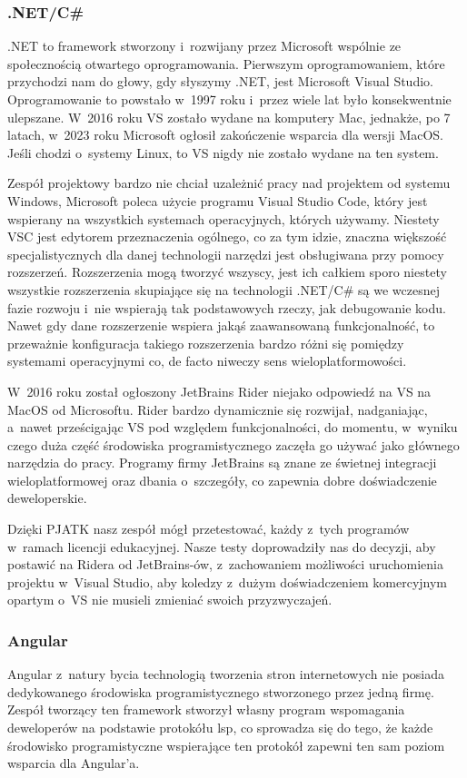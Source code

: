 \subsubsection{.NET/C\#}
.NET to framework stworzony i~rozwijany przez Microsoft wspólnie ze społecznością otwartego oprogramowania.
Pierwszym oprogramowaniem, które przychodzi nam do głowy, gdy słyszymy .NET, jest Microsoft Visual Studio.
Oprogramowanie to powstało w~1997 roku i~przez wiele lat było konsekwentnie ulepszane.
W~2016 roku VS zostało wydane na komputery Mac, jednakże, po 7 latach, w~2023 roku Microsoft ogłosił zakończenie wsparcia dla wersji MacOS.
Jeśli chodzi o~systemy Linux, to VS nigdy nie zostało wydane na ten system.

Zespół projektowy bardzo nie chciał uzależnić pracy nad projektem od systemu Windows, Microsoft poleca użycie programu Visual Studio Code, który jest wspierany na wszystkich systemach operacyjnych, których używamy.
Niestety VSC jest edytorem przeznaczenia ogólnego, co za tym idzie, znaczna większość specjalistycznych dla danej technologii narzędzi jest obsługiwana przy pomocy rozszerzeń.
Rozszerzenia mogą tworzyć wszyscy, jest ich całkiem sporo niestety wszystkie rozszerzenia skupiające się na technologii .NET/C\# są we wczesnej fazie rozwoju i~nie wspierają tak podstawowych rzeczy, jak debugowanie kodu.
Nawet gdy dane rozszerzenie wspiera jakąś zaawansowaną funkcjonalność, to przeważnie konfiguracja takiego rozszerzenia bardzo różni się pomiędzy systemami operacyjnymi co, de facto niweczy sens wieloplatformowości.

W~2016 roku został ogłoszony JetBrains Rider niejako odpowiedź na VS na MacOS od Microsoftu.
Rider bardzo dynamicznie się rozwijał, nadganiając, a~nawet prześcigając VS pod względem funkcjonalności, do momentu, w~wyniku czego duża część środowiska programistycznego zaczęła go używać jako głównego narzędzia do pracy.
Programy firmy JetBrains są znane ze świetnej integracji wieloplatformowej oraz dbania o~szczegóły, co zapewnia dobre doświadczenie deweloperskie.

Dzięki PJATK nasz zespół mógł przetestować, każdy z~tych programów w~ramach licencji edukacyjnej.
Nasze testy doprowadziły nas do decyzji, aby postawić na Ridera od JetBrains-ów, z~zachowaniem możliwości uruchomienia projektu w~Visual Studio, aby koledzy z~dużym doświadczeniem komercyjnym opartym o~VS nie musieli zmieniać swoich przyzwyczajeń.

\subsubsection{Angular}
Angular z~natury bycia technologią tworzenia stron internetowych nie posiada dedykowanego środowiska programistycznego stworzonego przez jedną firmę.
Zespół tworzący ten framework stworzył własny program wspomagania deweloperów na podstawie protokółu \acrshort{lsp}, co sprowadza się do tego, że każde środowisko programistyczne wspierające ten protokół zapewni ten sam poziom wsparcia dla Angular'a.


